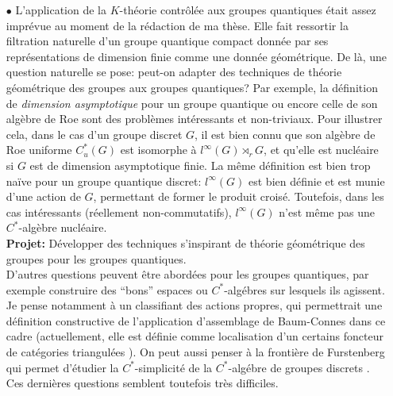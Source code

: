 \documentclass[a4paper,11pt]{article}
\begin{document}
\begin{itemize}
Dans ce cas, nous pouvons montrer l'existence d'un projecteur de Kazdhan, aux propri\'et\'e si exotiques que, moyennant des renforcements \`a la propr\'et\'e T, ne peut pas se trouver dans l'image de l'application d'assemblage de Baum-Connes.

\textbf{Projet:} D\'ecrire avec plus de pr\'ecision les liens entre la propri\'et\'e T dynamique et l'obstruction \`a la conjecture de Baum-Connes.\\

Il semble probable de pouvoir prouver que la propri\'et\'e T dynamique constitue, moyennant des conditions suppl\'ementaires, une obstruction \`a l'exactitude en $K$-th\'eorie de certaines $C^*$-alg\`ebres, comme dans les exemples de Skandalis \cite{skandalis1988notion}. Des calculs d\'ej\`a effectu\'es sur des classes d\'exemples confirment cette affirmation.\\

\item[$\bullet$] L'application de la $K$-th\'eorie contr\^ol\'ee aux groupes quantiques \'etait assez impr\'evue au moment de la r\'edaction de ma th\`ese. Elle fait ressortir la filtration naturelle d'un groupe quantique compact donn\'ee par ses repr\'esentations de dimension finie comme une donn\'ee g\'eom\'etrique. De l\`a, une question naturelle se pose: peut-on adapter des techniques de th\'eorie g\'eom\'etrique des groupes aux groupes quantiques? Par exemple, la d\'efinition de \textit{dimension asymptotique} pour un groupe quantique ou encore celle de son alg\`ebre de Roe sont des probl\`emes int\'eressants et non-triviaux. Pour illustrer cela, dans le cas d'un groupe discret $G$, il est bien connu que son alg\`ebre de Roe uniforme $C^*_u(G)$ est isomorphe \`a $l^\infty(G)\rtimes_r G$, et qu'elle est nucl\'eaire si $G$ est de dimension asymptotique finie. La m\^eme d\'efinition est bien trop na\"ive pour un groupe quantique discret: $l^\infty(G)$ est bien d\'efinie et est munie d'une action de $G$, permettant de former le produit crois\'e. Toutefois, dans les cas int\'eressants (r\'eellement non-commutatifs), $l^\infty(G)$ n'est m\^eme pas une $C^*$-alg\`ebre nucl\'eaire.  \\

\textbf{Projet:} D\'evelopper des techniques s'inspirant de th\'eorie g\'eom\'etrique des groupes pour les groupes quantiques.\\

D'autres questions peuvent \^etre abord\'ees pour les groupes quantiques, par exemple construire des ``bons'' espaces ou $C^*$-alg\'ebres sur lesquels ils agissent. Je pense notamment \`a un classifiant des actions propres, qui permettrait une d\'efinition constructive de l'application d'assemblage de Baum-Connes dans ce cadre (actuellement, elle est d\'efinie comme localisation d'un certains foncteur de cat\'egories triangul\'ees \cite{MeyerNest}). On peut aussi penser \`a la fronti\`ere de Furstenberg qui permet d'\'etudier la $C^*$-simplicit\'e de la $C^*$-alg\'ebre de groupes discrets \cite{kalantar2014boundaries}. Ces derni\`eres questions semblent toutefois tr\`es difficiles.\\ 


\end{itemize}
\end{document}

